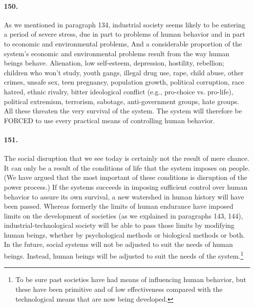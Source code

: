 \documentclass[12pt]{book}
\begin{document}
\paragraph{150.} As we mentioned in paragraph 134, industrial society seems likely to be entering a period of severe stress, due in part to problems of human behavior and in part to economic and environmental problems, And a considerable proportion of the system's economic and environmental problems result from the way human beings behave. Alienation, low self-esteem, depression, hostility, rebellion; children who won't study, youth gangs, illegal drug use, rape, child abuse, other crimes, unsafe sex, teen pregnancy, population growth, political corruption, race hatred, ethnic rivalry, bitter ideological conflict (e.g., pro-choice vs. pro-life), political extremism, terrorism, sabotage, anti-government groups, hate groups. All these threaten the very survival of the system. The system will therefore be FORCED to use every practical means of controlling human behavior.


\paragraph{151.}  The social disruption that we see today is certainly not the result of mere chance. It can only be a result of the conditions of life that the system imposes on people. (We have argued that the most important of these conditions is disruption of the power process.) If the systems succeeds in imposing sufficient control over human behavior to assure its own survival, a new watershed in human history will have been passed. Whereas formerly the limits of human endurance have imposed limits on the development of societies (as we explained in paragraphs 143, 144), industrial-technological society will be able to pass those limits by modifying human beings, whether by psychological methods or biological methods or both. In the future, social systems will not be adjusted to suit the needs of human beings. Instead, human beings will be adjusted to suit the needs of the system.\footnote{To be sure past societies have had means of influencing human behavior, but these have been primitive and of low effectiveness compared with the technological means that are now being developed.}
\end{document}
